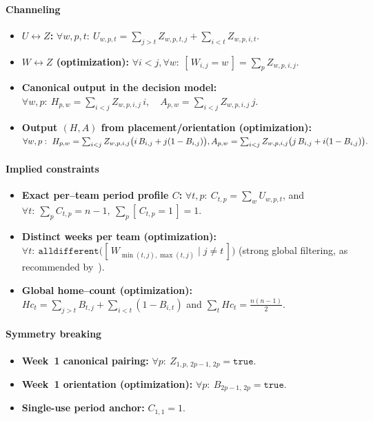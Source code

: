 \documentclass{article}
\begin{document}
\paragraph{Channeling}
\begin{itemize}\setlength{\itemsep}{2pt}
  \item \textbf{\(U\leftrightarrow Z\):}
        \(\forall w,p,t:\ 
          U_{w,p,t}=\sum_{j>t} Z_{w,p,t,j}+\sum_{i<t} Z_{w,p,i,t}\).
  \item \textbf{\(W\leftrightarrow Z\) (optimization):}
        \(\forall i<j,\forall w:\ 
          [\,W_{i,j}=w\,]=\sum_{p} Z_{w,p,i,j}\).
  \item \textbf{Canonical output in the decision model:} \\
        \(\forall w,p:\ 
          H_{p,w}=\sum_{i<j}Z_{w,p,i,j}\,i,\quad
          A_{p,w}=\sum_{i<j}Z_{w,p,i,j}\,j\).
  \item \textbf{Output \((H,A)\) from placement/orientation (optimization):}\\
        \(\forall w,p:\ 
          H_{p,w}=\sum_{i<j} Z_{w,p,i,j}\big(i\,B_{i,j}+j(1-B_{i,j})\big),\\
          A_{p,w}=\sum_{i<j} Z_{w,p,i,j}\big(j\,B_{i,j}+i(1-B_{i,j})\big).\)
\end{itemize}

\paragraph{Implied constraints}
\begin{itemize}\setlength{\itemsep}{2pt}
  \item \textbf{Exact per–team period profile \(C\):}
        \(\forall t,p:\ C_{t,p}=\sum_{w} U_{w,p,t}\), and
        \(\forall t:\ \sum_{p} C_{t,p}=n-1,\ 
          \sum_{p}[\,C_{t,p}=1\,]=1\).
  \item \textbf{Distinct weeks per team (optimization):}\\
        \(\forall t:\ 
          \texttt{alldifferent}\big([\,W_{\min(t,j),\max(t,j)}\mid j\neq t\,]\big)\)
        (strong global filtering, as recommended by~\cite{HenzMullerThiel2004}).
  \item \textbf{Global home–count (optimization):}
        \(Hc_t=\sum_{j>t}B_{t,j}+\sum_{i<t}(1-B_{i,t})\) and
        \(\sum_{t} Hc_t=\tfrac{n(n-1)}{2}\).
\end{itemize}

\paragraph{Symmetry breaking}
\begin{itemize}\setlength{\itemsep}{2pt}
  \item \textbf{Week~1 canonical pairing:}
        \(\forall p:\ Z_{1,p,\,2p-1,\,2p}=\texttt{true}\).
  \item \textbf{Week~1 orientation (optimization):}
        \(\forall p:\ B_{2p-1,\,2p}=\texttt{true}\).
  \item \textbf{Single-use period anchor:}
        \(C_{1,1}=1\).
\end{itemize}
\end{document}
